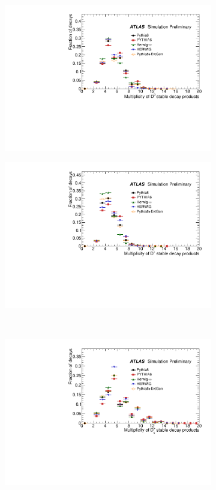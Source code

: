 \begin{figure}
\centering
\begin{subfigure}[]{0.45\textwidth}
\includegraphics[width=\textwidth]{evtgen/figures/EvtGen/D0/h_species_multiplicity.pdf}
\end{subfigure}
\begin{subfigure}[]{0.45\textwidth}
\includegraphics[width=\textwidth]{evtgen/figures/EvtGen/D+/h_species_multiplicity.pdf}
\end{subfigure}\\
\begin{subfigure}[]{0.45\textwidth}
\includegraphics[width=\textwidth]{evtgen/figures/EvtGen/Ds+/h_species_multiplicity.pdf}

\end{subfigure}
\end{figure}
